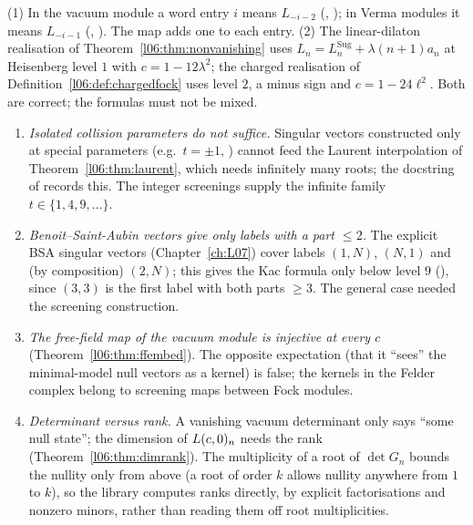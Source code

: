 \begin{warning}[title={Two word conventions, two free-field normalisations}]\label{l06:warn:conventions}
(1) In the vacuum module a word entry $i$ means $L_{-i-2}$ (, ); in Verma
modules it means $L_{-i-1}$ (, ). The map  adds one
to each entry. (2) The linear-dilaton realisation of Theorem~\ref{l06:thm:nonvanishing} uses
$L_n = L^{\mathrm{Sug}}_n+\lambda(n+1)a_n$ at Heisenberg level $1$ with $c = 1-12\lambda^2$; the charged
realisation of Definition~\ref{l06:def:chargedfock} uses level $2$, a minus sign and $c = 1-24\ell^2$. Both are
correct; the formulas must not be mixed.
\end{warning}

\begin{warning}[title={Dead ends and expectations that turned out false}]\label{l06:warn:deadends}
\begin{enumerate}
\item \emph{Isolated collision parameters do not suffice.} Singular vectors constructed only at special
  parameters (e.g.\ $t = \pm1$, ) cannot feed the Laurent interpolation of
  Theorem~\ref{l06:thm:laurent}, which needs infinitely many roots; the docstring of
  \allowbreak{}\allowbreak{}\allowbreak{}\allowbreak{}\allowbreak{} records this. The integer screenings supply the infinite
  family $t\in\{1,4,9,\dots\}$.
\item \emph{Benoit--Saint-Aubin vectors give only labels with a part $\le2$.} The explicit BSA singular
  vectors (Chapter~\ref{ch:L07}) cover labels $(1,N)$, $(N,1)$ and (by composition) $(2,N)$; this gives the
  Kac formula only below level $9$ (\allowbreak{}\allowbreak{}\allowbreak{}\allowbreak{}), since $(3,3)$ is the
  first label with both parts $\ge3$. The general case needed the screening construction.
\item \emph{The free-field map of the vacuum module is injective at every $c$}
  (Theorem~\ref{l06:thm:ffembed}). The opposite expectation (that it ``sees'' the minimal-model null vectors as
  a kernel) is false; the kernels in the Felder complex belong to screening maps between Fock modules.
\item \emph{Determinant versus rank.} A vanishing vacuum determinant only says ``some null state''; the
  dimension of $L(c,0)_n$ needs the rank (Theorem~\ref{l06:thm:dimrank}). The multiplicity of a root of
  $\det G_n$ bounds the nullity only from above (a root of order $k$ allows nullity anywhere from $1$ to $k$), so
  the library computes ranks directly, by explicit factorisations and nonzero minors, rather than reading them
  off root multiplicities.
\end{enumerate}
\end{warning}

